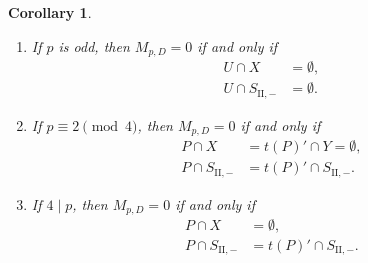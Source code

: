 \documentclass[11pt,a4paper]{amsart}
\theoremstyle{plain}
\newtheorem{cor}[theorem]{Corollary}
\numberwithin{equation}{section}
\begin{document}
\begin{cor}\label{cor:B-parity}
\begin{enumerate}
\item
If \(p\) is odd, then \(M_{p,D}=0\) if and only if
\begin{align}
U\cap X&=\emptyset,\label{oddCondition1}\\
U\cap S_{\mathrm{II},-}&=\emptyset.\label{oddCondition3}
\end{align}
\item
If \(p\equiv2\pmod4\), then \(M_{p,D}=0\) if and only if
\begin{align}
P\cap X&=t(P)'\cap Y=\emptyset,\label{2Condition1}\\
P\cap S_{\mathrm{II},-}
&=t(P)'\cap S_{\mathrm{II},-}.\label{2Condition3}
\end{align}
\item
If \(4\mid p\), then \(M_{p,D}=0\) if and only if
\begin{align}
P\cap X&=\emptyset,\label{4Condition1}\\
P\cap S_{\mathrm{II},-}
&=t(P)'\cap S_{\mathrm{II},-}.\label{4Condition3}
\end{align}
\end{enumerate}
\end{cor}
\end{document}
